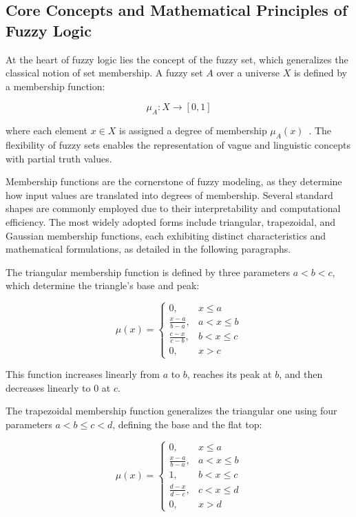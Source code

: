 \subsection{Core Concepts and Mathematical Principles of Fuzzy Logic}

At the heart of fuzzy logic lies the concept of the fuzzy set, which generalizes the classical notion of set membership. A fuzzy set $A$ over a universe $X$ is defined by a membership function:

\begin{equation}
\mu_A : X \rightarrow [0, 1]
\label{eq:membership-function}
\end{equation}

where each element $x \in X$ is assigned a degree of membership $\mu_A(x)$~\parencite{sadollah2018introductory, beliakov1996fuzzy, dombi2021modifiers}. The flexibility of fuzzy sets enables the representation of vague and linguistic concepts with partial truth values.

Membership functions are the cornerstone of fuzzy modeling, as they determine how input values are translated into degrees of membership. Several standard shapes are commonly employed due to their interpretability and computational efficiency. The most widely adopted forms include triangular, trapezoidal, and Gaussian membership functions, each exhibiting distinct characteristics and mathematical formulations, as detailed in the following paragraphs.

The triangular membership function is defined by three parameters $a < b < c$, which determine the triangle's base and peak:

\begin{equation}
\mu(x) =
\begin{cases}
0, & x \leq a \\
\frac{x-a}{b-a}, & a < x \leq b \\
\frac{c-x}{c-b}, & b < x \leq c \\
0, & x > c
\end{cases}
\label{eq:triangular-mf}
\end{equation}

This function increases linearly from $a$ to $b$, reaches its peak at $b$, and then decreases linearly to $0$ at $c$.

The trapezoidal membership function generalizes the triangular one using four parameters $a < b \leq c < d$, defining the base and the flat top:

\begin{equation}
\mu(x) =
\begin{cases}
0, & x \leq a \\
\frac{x-a}{b-a}, & a < x \leq b \\
1, & b < x \leq c \\
\frac{d-x}{d-c}, & c < x \leq d \\
0, & x > d
\end{cases}
\label{eq:trapezoidal-mf}
\end{equation}

